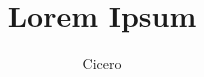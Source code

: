 \documentclass{article}
\title{Lorem Ipsum}
\author{Cicero}
\begin{document}
  \lipsum
\end{document}
